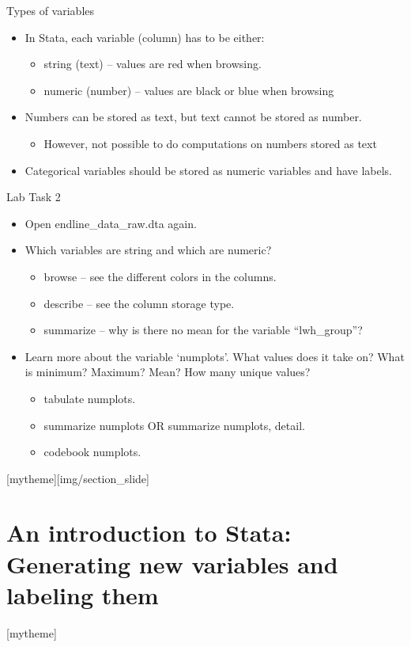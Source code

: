 \documentclass[aspectratio=169]{beamer}
\newcommand{\sectionpic}[2]{
	\setbeamertemplate{section page}[mytheme][#2]
	\section{#1}
	\setbeamertemplate{section page}[mytheme]
}
\begin{document}
\begin{frame}{Types of variables}
\begin{itemize}
	\item In Stata, each variable (column) has to be either:
	\begin{itemize}
		\item string (text) – values are red when browsing.
		\item numeric (number) – values are black or blue when browsing
	\end{itemize}
	\item Numbers can be stored as text, but text cannot be stored as number. 
	\begin{itemize}
		\item 	However, not possible to do computations on numbers stored as text 
	\end{itemize}
	\item Categorical variables should be stored as numeric variables and have labels.
\end{itemize}
\end{frame}

\begin{frame}{Lab Task 2}
\begin{itemize}
	\item Open endline\_data\_raw.dta again.
	\item Which variables are string and which are numeric?	
		\begin{itemize}
			\item browse – see the different colors in the columns.		
			\item describe – see the column storage type.
			\item summarize – why is there no mean for the variable  “lwh\_group”?		
	\end{itemize}
	\item Learn more about the variable ‘numplots’. What values does it take on? What is minimum? Maximum? Mean? How many unique values?
		\begin{itemize}
			\item tabulate numplots.
			\item summarize numplots OR summarize numplots, detail.
			\item codebook numplots.
		\end{itemize}
\end{itemize}
\end{frame}

\sectionpic{An introduction to Stata: \newline Generating new variables and labeling them}{img/section_slide}
\end{document}
